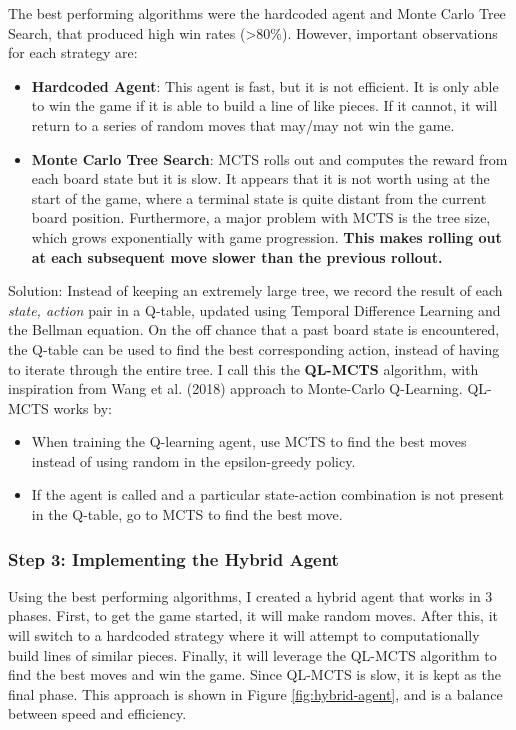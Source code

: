 The best performing algorithms were the hardcoded agent and Monte Carlo Tree Search, that produced high win rates (>80\%). However, important observations for each strategy are:

\begin{itemize}
    \item \textbf{Hardcoded Agent}: This agent is fast, but it is not efficient. It is only able to win the game if it is able to build a line of like pieces. If it cannot, it will return to a series of random moves that may/may not win the game.
    \item \textbf{Monte Carlo Tree Search}: MCTS rolls out and computes the reward from each board state but it is slow. It appears that it is not worth using at the start of the game, where a terminal state is quite distant from the current board position. Furthermore, a major problem with MCTS is the tree size, which grows exponentially with game progression. \textbf{This makes rolling out at each subsequent move slower than the previous rollout.} \\
\end{itemize}

Solution: Instead of keeping an extremely large tree, we record the result of each \textit{state, action} pair in a Q-table, updated using Temporal Difference Learning and the Bellman equation. On the off chance that a past board state is encountered, the Q-table can be used to find the best corresponding action, instead of having to iterate through the entire tree. I call this the \textbf{QL-MCTS} algorithm, with inspiration from Wang et al. (2018) approach to Monte-Carlo Q-Learning. QL-MCTS works by:

\begin{itemize}
    \item When training the Q-learning agent, use MCTS to find the best moves instead of using random in the epsilon-greedy policy.
    \item If the agent is called and a particular state-action combination is not present in the Q-table, go to MCTS to find the best move.
\end{itemize}

\subsubsection{Step 3: Implementing the Hybrid Agent}

Using the best performing algorithms, I created a hybrid agent that works in 3 phases. First, to get the game started, it will make random moves. After this, it will switch to a hardcoded strategy where it will attempt to computationally build lines of similar pieces. Finally, it will leverage the QL-MCTS algorithm to find the best moves and win the game. Since QL-MCTS is slow, it is kept as the final phase. This approach is shown in Figure \ref{fig:hybrid-agent}, and is a balance between speed and efficiency.

